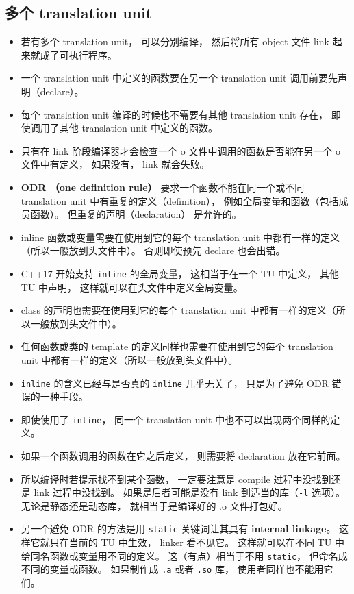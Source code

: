 \subsection{多个  translation unit}
\begin{itemize}
\item 若有多个 translation unit， 可以分别编译， 然后将所有 object 文件 link 起来就成了可执行程序。
\item 一个 translation unit 中定义的函数要在另一个 translation unit 调用前要先声明（declare）。
\item 每个 translation unit 编译的时候也不需要有其他 translation unit 存在， 即使调用了其他 translation unit 中定义的函数。
\item 只有在 link 阶段编译器才会检查一个 o 文件中调用的函数是否能在另一个 o 文件中有定义， 如果没有， link 就会失败。
\item \textbf{ODR （one definition rule）} 要求一个函数不能在同一个或不同 translation unit 中有重复的定义（definition）， 例如全局变量和函数（包括成员函数）。 但重复的声明（declaration） 是允许的。
\item inline 函数或变量需要在使用到它的每个 translation unit 中都有一样的定义（所以一般放到头文件中）。 否则即使预先 declare 也会出错。
\item C++17 开始支持 \verb|inline| 的全局变量， 这相当于在一个 TU 中定义， 其他 TU 中声明， 这样就可以在头文件中定义全局变量。
\item class 的声明也需要在使用到它的每个 translation unit 中都有一样的定义（所以一般放到头文件中）。
\item 任何函数或类的 template 的定义同样也需要在使用到它的每个 translation unit 中都有一样的定义（所以一般放到头文件中）。
\item \verb|inline| 的含义已经与是否真的 \verb|inline| 几乎无关了， 只是为了避免 ODR 错误的一种手段。
\item 即使使用了 \verb|inline|， 同一个 translation unit 中也不可以出现两个同样的定义。
\item 如果一个函数调用的函数在它之后定义， 则需要将 declaration 放在它前面。
\item 所以编译时若提示找不到某个函数， 一定要注意是 compile 过程中没找到还是 link 过程中没找到。 如果是后者可能是没有 link 到适当的库（\verb|-l| 选项）。 无论是静态还是动态库， 就相当于是编译好的 .o 文件打包好。
\item 另一个避免 ODR 的方法是用 \verb|static| 关键词让其具有 \textbf{internal linkage}。 这样它就只在当前的 TU 中生效， linker 看不见它。 这样就可以在不同 TU 中给同名函数或变量用不同的定义。 这（有点）相当于不用 \verb|static|， 但命名成不同的变量或函数。 如果制作成 \verb|.a| 或者 \verb|.so| 库， 使用者同样也不能用它们。
\end{itemize}
